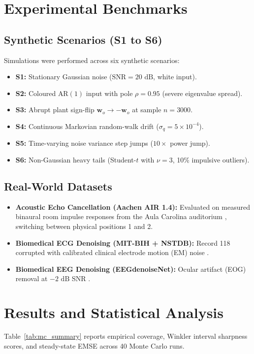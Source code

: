 \documentclass[journal,twocolumn]{IEEEtran}
\begin{document}
\section{Experimental Benchmarks}
\subsection{Synthetic Scenarios (S1 to S6)}
Simulations were performed across six synthetic scenarios:
\begin{itemize}
    \item \textbf{S1:} Stationary Gaussian noise ($\text{SNR}=20\text{ dB}$, white input).
    \item \textbf{S2:} Coloured $\text{AR}(1)$ input with pole $\rho = 0.95$ (severe eigenvalue spread).
    \item \textbf{S3:} Abrupt plant sign-flip $\mathbf{w}_o \to -\mathbf{w}_o$ at sample $n=3000$.
    \item \textbf{S4:} Continuous Markovian random-walk drift ($\sigma_q = 5\times 10^{-4}$).
    \item \textbf{S5:} Time-varying noise variance step jumps ($10\times$ power jump).
    \item \textbf{S6:} Non-Gaussian heavy tails (Student-$t$ with $\nu=3$, 10\% impulsive outliers).
\end{itemize}

\subsection{Real-World Datasets}
\begin{itemize}
    \item \textbf{Acoustic Echo Cancellation (Aachen AIR 1.4):} Evaluated on measured binaural room impulse responses from the Aula Carolina auditorium \cite{jeub2009binaural}, switching between physical positions 1 and 2.
    \item \textbf{Biomedical ECG Denoising (MIT-BIH + NSTDB):} Record 118 corrupted with calibrated clinical electrode motion (EM) noise \cite{moody1984noise, goldberger2000physiobank}.
    \item \textbf{Biomedical EEG Denoising (EEGdenoiseNet):} Ocular artifact (EOG) removal at $-2\text{ dB}$ SNR \cite{zhang2021eegdenoisenet}.
\end{itemize}

\section{Results and Statistical Analysis}
Table~\ref{tab:mc_summary} reports empirical coverage, Winkler interval sharpness scores, and steady-state EMSE across 40 Monte Carlo runs.
\end{document}
